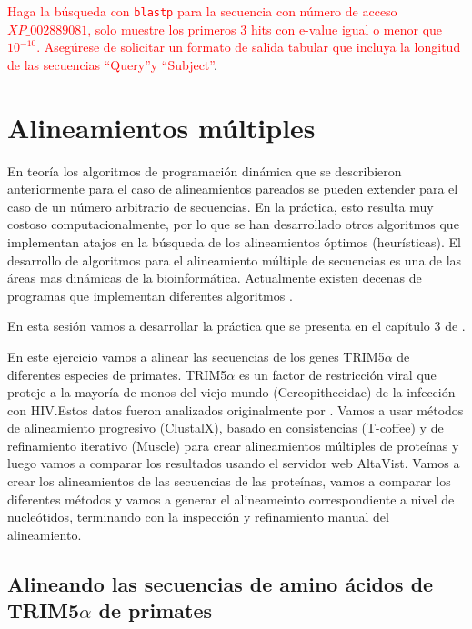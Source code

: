 \documentclass[letter,11pt]{book}
\begin{document}
\textcolor{red}{Haga la búsqueda con \Verb+blastp+ para la secuencia con número de acceso $XP\_002889081$, solo muestre los primeros 3 hits con e-value igual o menor que $10^{-10}$. Asegúrese de solicitar un formato de salida tabular que incluya la longitud de las secuencias ``Query''y ``Subject''}.

\chapter{Alineamientos múltiples}

En teoría los algoritmos de programación dinámica que se describieron anteriormente para el caso de alineamientos pareados se pueden extender para el caso de un número arbitrario de secuencias.  En la práctica, esto resulta muy costoso computacionalmente, por lo que se han desarrollado otros algoritmos que implementan atajos en la búsqueda de los alineamientos óptimos (heurísticas). El desarrollo de algoritmos para el alineamiento múltiple de secuencias es una de las áreas mas dinámicas de la bioinformática.  Actualmente existen decenas de programas que implementan diferentes algoritmos \citetext{vea \citealp{Notredame2007} y \citealp{Lemey2009} para una revisión reciente del tema}.

En esta sesión vamos a desarrollar la práctica que se presenta en el capítulo 3 de \citealp{Lemey2009}.

En este ejercicio vamos a alinear las secuencias de los genes TRIM5$\alpha$ de diferentes especies de primates. TRIM5$\alpha$ es un factor de restricción viral que proteje a la mayoría de monos del viejo mundo (Cercopithecidae) de la infección con HIV.Estos datos fueron analizados originalmente por \citealp{Sawyer2005}. Vamos a usar métodos de alineamiento progresivo ({\sc ClustalX}), basado en consistencias ({\sc T-coffee}) y de refinamiento iterativo ({\sc Muscle}) para crear alineamientos múltiples de proteínas y luego vamos a comparar los resultados usando el servidor web {\sc AltaVist}. Vamos a crear los alineamientos de las secuencias de las proteínas, vamos a comparar los diferentes métodos y vamos a generar el alineameinto correspondiente a nivel de nucleótidos, terminando con la inspección y refinamiento manual del alineamiento.

\section{Alineando las secuencias de amino ácidos de TRIM5$\alpha$ de primates}
\end{document}
